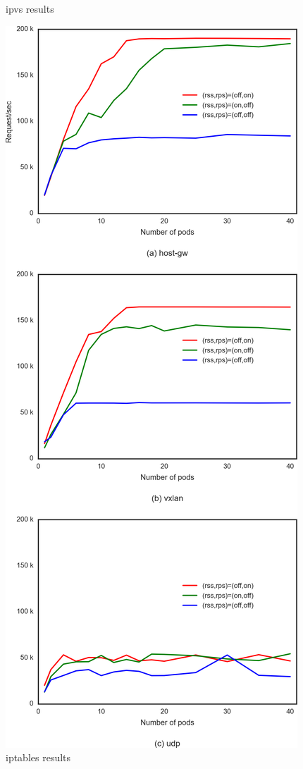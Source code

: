 \begin{figure}
\caption{ipvs results}
\label{fig:ipvs3figs}
\end{figure}

\begin{figure}
\includegraphics[width=\columnwidth]{Figs/iptables_3figs}
\caption{iptables results}
\label{fig:iptabls3figs}
\end{figure}

